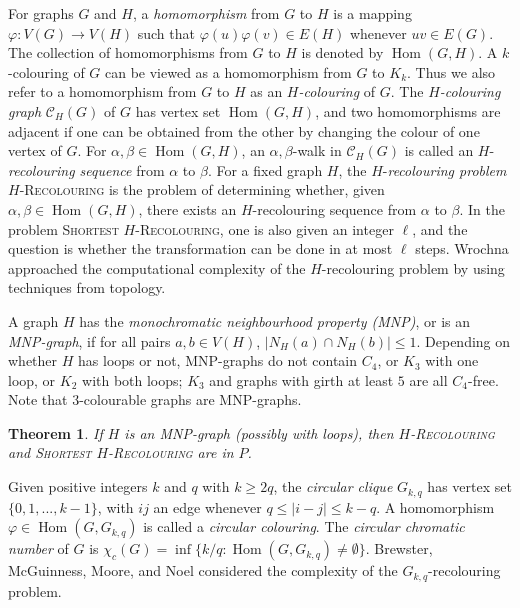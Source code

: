 \documentclass[12pt]{article}%
\newtheorem{theorem}{Theorem}[section]
\begin{document}
\label{SecWrochna}For graphs $G$ and $H$, a \emph{homomorphism} from $G$ to
$H$ is a mapping $\varphi:V(G)\rightarrow V(H)$ such that $\varphi
(u)\varphi(v)\in E(H)$ whenever $uv\in E(G)$. The collection of homomorphisms
from $G$ to $H$ is denoted by $\operatorname{Hom}(G,H)$. A $k$-colouring of
$G$ can be viewed as a homomorphism from $G$ to $K_{k}$. Thus we also refer to
a homomorphism from $G$ to $H$ as an $H$\emph{-colouring} of $G$. The
$H$\emph{-colouring graph} $\mathcal{C}_{H}(G)$ of $G$ has vertex set
$\operatorname{Hom}(G,H)$, and two homomorphisms are adjacent if one can be
obtained from the other by changing the colour of one vertex of $G$. For
$\alpha,\beta\in\operatorname{Hom}(G,H)$, an $\alpha,\beta$-walk in
$\mathcal{C}_{H}(G)$ is called an $H$-\emph{recolouring sequence} from
$\alpha$ to $\beta$. For a fixed graph $H$, the $H$-\emph{recolouring problem}
$H$\textsc{-Recolouring} is the problem of determining whether, given
$\alpha,\beta\in\operatorname{Hom}(G,H)$, there exists an $H$-recolouring
sequence from $\alpha$ to $\beta$. In the problem \textsc{Shortest}
$H$\textsc{-Recolouring}, one is also given an integer $\ell$, and the
question is whether the transformation can be done in at most $\ell$ steps.
Wrochna \cite{26CM-WrochnaDiss} approached the computational complexity of the
$H$-recolouring problem by using techniques from topology.

A graph $H$ has the \emph{monochromatic neighbourhood property (MNP)}, or is
an \emph{MNP-graph}, if for all pairs $a,b\in V(H)$, $|N_{H}(a)\cap
N_{H}(b)|\leq1$. Depending on whether $H$ has loops or not, MNP-graphs do not
contain $C_{4}$, or $K_{3}$ with one loop, or $K_{2}$ with both loops; $K_{3}$
and graphs with girth at least $5$ are all $C_{4}$-free. Note that
$3$-colourable graphs are MNP-graphs.

\begin{theorem}
\emph{\cite{26CM-WrochnaDiss}}\hspace{0.1in}If $H$ is an MNP-graph (possibly
with loops), then $H$\textsc{-Recolouring} and \textsc{Shortest}
$H$\textsc{-Recolouring} are in $P$.
\end{theorem}

Given positive integers $k$ and $q$ with $k\geq2q$, the \emph{circular clique}
$G_{k,q}$ has vertex set $\{0,1,...,k-1\}$, with $ij$ an edge whenever
$q\leq|i-j|\leq k-q$. A homomorphism $\varphi\in\operatorname{Hom}(G,G_{k,q})$
is called a \emph{circular colouring}. The \emph{circular chromatic number} of
$G$ is $\chi_{c}(G)=\inf\{k/q:\operatorname{Hom}(G,G_{k,q})\neq\emptyset\}$.
Brewster, McGuinness, Moore, and Noel \cite{26CM-BMMN} considered the
complexity of the $G_{k,q}$-recolouring problem.
\end{document}

